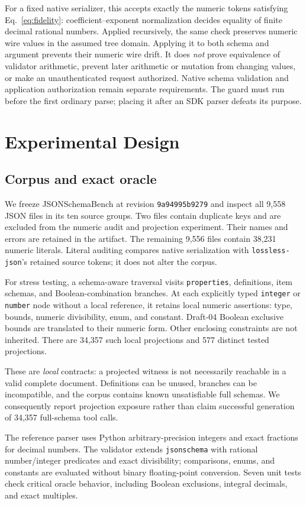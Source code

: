 \documentclass[11pt]{article}
\begin{document}
For a fixed native serializer, this accepts exactly the numeric tokens satisfying Eq.~\ref{eq:fidelity}: coefficient--exponent normalization decides equality of finite decimal rational numbers. Applied recursively, the same check preserves numeric wire values in the assumed tree domain. Applying it to both schema and argument prevents their numeric wire drift. It does \emph{not} prove equivalence of validator arithmetic, prevent later arithmetic or mutation from changing values, or make an unauthenticated request authorized. Native schema validation and application authorization remain separate requirements. The guard must run before the first ordinary parse; placing it after an SDK parser defeats its purpose.

\section{Experimental Design}
\subsection{Corpus and exact oracle}
We freeze JSONSchemaBench at revision \texttt{9a94995b9279} and inspect all 9,558 JSON files in its ten source groups. Two files contain duplicate keys and are excluded from the numeric audit and projection experiment. Their names and errors are retained in the artifact. The remaining 9,556 files contain 38,231 numeric literals. Literal auditing compares native serialization with \texttt{lossless-json}'s retained source tokens; it does not alter the corpus.

For stress testing, a schema-aware traversal visits \texttt{properties}, definitions, item schemas, and Boolean-combination branches. At each explicitly typed \texttt{integer} or \texttt{number} node without a local reference, it retains local numeric assertions: type, bounds, numeric divisibility, enum, and constant. Draft-04 Boolean exclusive bounds are translated to their numeric form. Other enclosing constraints are not inherited. There are 34,357 such local projections and 577 distinct tested projections.

These are \emph{local} contracts: a projected witness is not necessarily reachable in a valid complete document. Definitions can be unused, branches can be incompatible, and the corpus contains known unsatisfiable full schemas. We consequently report projection exposure rather than claim successful generation of 34,357 full-schema tool calls.

The reference parser uses Python arbitrary-precision integers and exact fractions for decimal numbers. The validator extends \texttt{jsonschema} with rational number/integer predicates and exact divisibility; comparisons, enums, and constants are evaluated without binary floating-point conversion. Seven unit tests check critical oracle behavior, including Boolean exclusions, integral decimals, and exact multiples.
\end{document}
